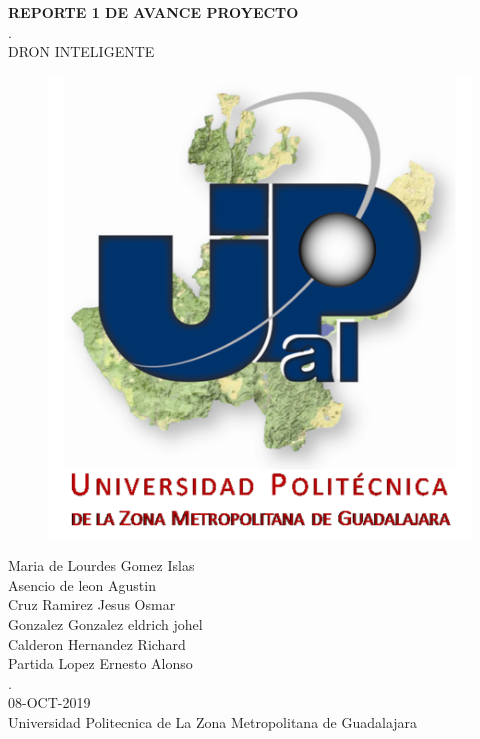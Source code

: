 \documentclass[11pt,a4paper]{article}
\begin{document}
\begin{center}
\textbf{REPORTE 1 DE AVANCE PROYECTO}\\
.\\
DRON INTELIGENTE
\end{center}

\begin{figure}[h]
\centering
\includegraphics[width=12.5cm]{upzmg.png} 
\end{figure}

\begin{center}
Maria de Lourdes Gomez Islas\\
Asencio de leon Agustin\\
Cruz Ramirez Jesus Osmar\\
Gonzalez Gonzalez eldrich johel\\
Calderon Hernandez Richard\\
Partida Lopez Ernesto Alonso\\
.\\
08-OCT-2019\\
Universidad Politecnica de La Zona Metropolitana de Guadalajara
\end{center}

\newpage 
\end{document}
